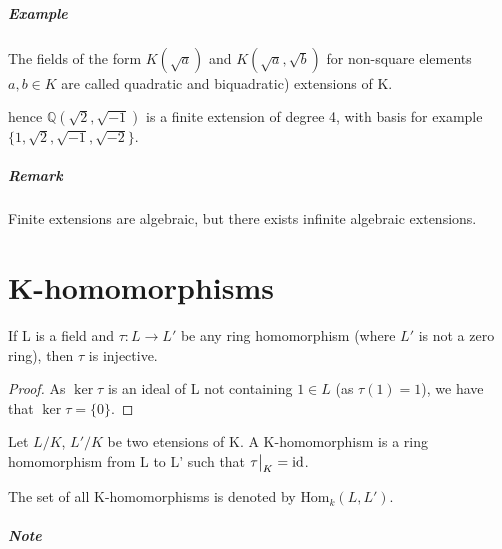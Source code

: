 \subparagraph{Example}

The fields of the form $K(\sqrt{a})$ and $K(\sqrt{a}, \sqrt{b})$ for non-square elements $a, b \in K$ are called quadratic and biquadratic) extensions of K.
\begin{figure}[H]
  \centering
{}
\end{figure}
hence $\mathbb{Q}(\sqrt{2}, \sqrt{-1})$ is a finite extension of degree 4, with basis for example $\{1, \sqrt{2}, \sqrt{-1}, \sqrt{-2}\}$.

\subparagraph{Remark}
Finite extensions are algebraic, but there exists infinite algebraic extensions.

\section{K-homomorphisms}

\begin{lemma}\label{lemma:11}
  If L is a field and $\tau : L \rightarrow L'$ be any ring homomorphism (where $L'$ is not a zero ring), then $\tau$ is injective.
\end{lemma}

\begin{proof}
  As $\ker \tau$ is an ideal of L not containing $1 \in L$ (as $\tau(1) = 1$), we have that $\ker \tau = \{0\}$.
\end{proof}

\begin{definition}\label{def:12}
  Let $L/K$, $L'/K$ be two etensions of K. A K-homomorphism is a ring homomorphism from L to L' such that $\restr{\tau}{K} = \text{id}$. 

  The set of all K-homomorphisms is denoted by $\text{Hom}_k\left(L, L'\right)$.
\end{definition}

\subparagraph{Note}

